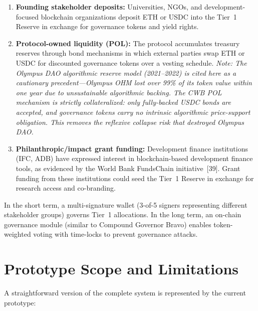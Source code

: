 \documentclass[12pt,a4paper]{report}
\begin{document}
\begin{enumerate}[noitemsep]
\item \textbf{Founding stakeholder deposits:} Universities, NGOs, and development-focused blockchain organizations deposit ETH or USDC into the Tier~1 Reserve in exchange for governance tokens and yield rights.
\item \textbf{Protocol-owned liquidity (POL):} The protocol accumulates treasury reserves through bond mechanisms in which external parties swap ETH or USDC for discounted governance tokens over a vesting schedule. \textit{Note: The Olympus DAO algorithmic reserve model (2021--2022) is cited here as a cautionary precedent---Olympus OHM lost over 99\% of its token value within one year due to unsustainable algorithmic backing. The CWB POL mechanism is strictly collateralized: only fully-backed USDC bonds are accepted, and governance tokens carry no intrinsic algorithmic price-support obligation. This removes the reflexive collapse risk that destroyed Olympus DAO.}
\item \textbf{Philanthropic/impact grant funding:} Development finance institutions (IFC, ADB) have expressed interest in blockchain-based development finance tools, as evidenced by the World Bank FundsChain initiative~[39]. Grant funding from these institutions could seed the Tier~1 Reserve in exchange for research access and co-branding.
\end{enumerate}

In the short term, a multi-signature wallet (3-of-5 signers representing different stakeholder groups) governs Tier~1 allocations. In the long term, an on-chain governance module (similar to Compound Governor Bravo) enables token-weighted voting with time-locks to prevent governance attacks.

\section{Prototype Scope and Limitations}

A straightforward version of the complete system is represented by the current prototype:
\end{document}

